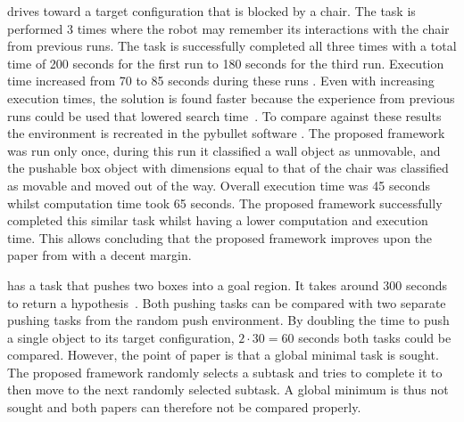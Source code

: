 \citeauthor{wang_affordancebased_2020}
drives toward a target configuration that is blocked by a chair.  The task is performed 3 times where the robot may remember its interactions with the chair from previous runs. The task is successfully completed all three times with a total time of 200 seconds for the first run to 180 seconds for the third run. Execution time increased from 70 to 85 seconds during these runs . Even with increasing execution times, the solution is found faster because the experience from previous runs could be used that lowered search time~\cite{wang_affordancebased_2020}. To compare against these results the environment is recreated in the pybullet software . The proposed framework was run only once, during this run it classified a wall object as unmovable, and the pushable box object with dimensions equal to that of the chair was classified as movable and moved out of the way. Overall execution time was 45 seconds whilst computation time took 65 seconds. The proposed framework successfully completed this similar task whilst having a lower computation and execution time. This allows concluding that the proposed framework improves upon the paper from \citeauthor{wang_affordancebased_2020} with a decent margin.\bs
{}

\citeauthor{vega-brown_asymptotically_2020} has a task that pushes two boxes into a goal region. It takes around 300 seconds to return a hypothesis~\cite{vega-brown_asymptotically_2020}. Both pushing tasks can be compared with two separate pushing tasks from the random push environment. By doubling the time to push a single object to its target configuration, $2 \cdot 30 = 60$ seconds both tasks could be compared. However, the point of \citeauthor{vega-brown_asymptotically_2020} paper is that a global minimal task is sought. The proposed framework randomly selects a subtask and tries to complete it to then move to the next randomly selected subtask. A global minimum is thus not sought and both papers can therefore not be compared properly.\bs

